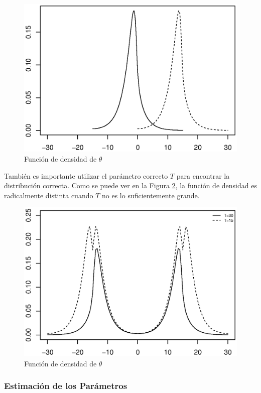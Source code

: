 \documentclass[11pt]{article}
\numberwithin{equation}{section} %
\begin{document}
\begin{figure}[htbp] \centering
\includegraphics[scale=0.75,trim=0 1cm 0 1cm]{probpmshift.eps}
\caption{Función de densidad de $\theta$}
\label{probmtshift}
\end{figure}

También es importante utilizar el parámetro correcto $T$ para encontrar la distribución correcta. Como se puede ver en la Figura \ref{probmtpar}, la función de densidad es radicalmente distinta cuando $T$ no es lo suficientemente grande.

\begin{figure}[htbp] \centering
\includegraphics[scale=0.75,trim=0 1cm 0 1cm]{probpmpar.eps}
\caption{Función de densidad de $\theta$}
\label{probmtpar}
\end{figure}

\subsubsection{Estimación de los Parámetros}
\end{document}
